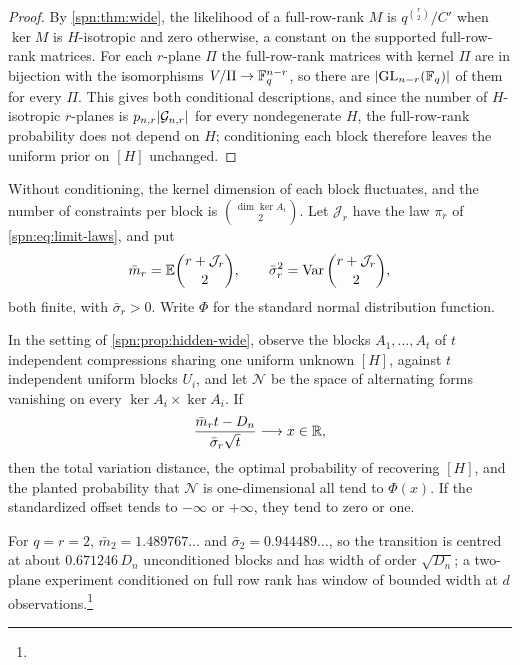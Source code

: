 \begin{proof}
By \cref{spn:thm:wide}, the likelihood of a full-row-rank $M$ is $q^{\binom r2}/C'$ when $\ker M$ is
$H$-isotropic and zero otherwise, a constant on the supported full-row-rank matrices. For each
$r$-plane $\Pi$ the full-row-rank matrices with kernel $\Pi$ are in bijection with the isomorphisms
$V/\Pi\to\mathbb{F}_q^{n-r}$, so there are $\lvert\operatorname{GL}_{n-r}(\mathbb{F}_q)\rvert$ of them for every $\Pi$. This gives both
conditional descriptions, and since the number of $H$-isotropic $r$-planes is
$p_{n,r}\lvert\mathcal G_{n,r}\rvert$ for every nondegenerate $H$, the full-row-rank probability does not
depend on $H$; conditioning each block therefore leaves the uniform prior on $[H]$ unchanged.
\end{proof}

Without conditioning, the kernel dimension of each block fluctuates, and the number of constraints
per block is $\binom{\dim\ker A_i}2$. Let $\mathcal J_r$ have the law $\pi_r$ of
\eqref{spn:eq:limit-laws}, and put
\[
 \bar m_r=\mathbb{E}\binom{r+\mathcal J_r}2,\qquad \bar\sigma_r^2=\operatorname{Var}\binom{r+\mathcal J_r}2,
\]
both finite, with $\bar\sigma_r>0$. Write $\Phi$ for the standard normal distribution function.

\begin{theorem}\label{spn:thm:hidden-gauss}
In the setting of \cref{spn:prop:hidden-wide}, observe the blocks $A_1,\dots,A_t$ of $t$ independent
compressions sharing one uniform unknown $[H]$, against $t$ independent uniform blocks $U_i$, and let
$\mathcal N$ be the space of alternating forms vanishing on every $\ker A_i\times\ker A_i$. If
\[
 \frac{\bar m_rt-D_n}{\bar\sigma_r\sqrt t}\longrightarrow x\in\mathbb{R},
\]
then the total variation distance, the optimal probability of recovering $[H]$, and the planted
probability that $\mathcal N$ is one-dimensional all tend to $\Phi(x)$. If the standardized offset
tends to $-\infty$ or $+\infty$, they tend to zero or one.
\end{theorem}

For $q=r=2$, $\bar m_2=1.489767\ldots$ and $\bar\sigma_2=0.944489\ldots$, so the transition is centred
at about $0.671246\,D_n$ unconditioned blocks and has width of order $\sqrt{D_n}$; a two-plane experiment
conditioned on full row rank has window of bounded width at $d$
observations.\footnote{\raggedright{}}

